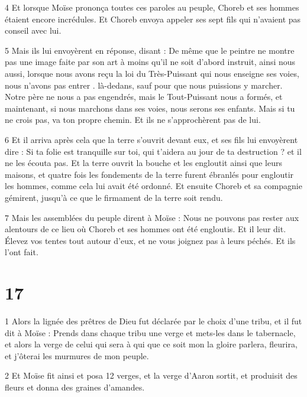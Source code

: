 \par 4 Et lorsque Moïse prononça toutes ces paroles au peuple, Choreb et ses hommes étaient encore incrédules. Et Choreb envoya appeler ses sept fils qui n'avaient pas conseil avec lui.

\par 5 Mais ils lui envoyèrent en réponse, disant : De même que le peintre ne montre pas une image faite par son art à moins qu'il ne soit d'abord instruit, ainsi nous aussi, lorsque nous avons reçu la loi du Très-Puissant qui nous enseigne ses voies, nous n'avons pas entrer . là-dedans, sauf pour que nous puissions y marcher. Notre père ne nous a pas engendrés, mais le Tout-Puissant nous a formés, et maintenant, si nous marchons dans ses voies, nous serons ses enfants. Mais si tu ne crois pas, va ton propre chemin. Et ils ne s'approchèrent pas de lui.

\par 6 Et il arriva après cela que la terre s'ouvrit devant eux, et ses fils lui envoyèrent dire : Si ta folie est tranquille sur toi, qui t'aidera au jour de ta destruction ? et il ne les écouta pas. Et la terre ouvrit la bouche et les engloutit ainsi que leurs maisons, et quatre fois les fondements de la terre furent ébranlés pour engloutir les hommes, comme cela lui avait été ordonné. Et ensuite Choreb et sa compagnie gémirent, jusqu'à ce que le firmament de la terre soit rendu.

\par 7 Mais les assemblées du peuple dirent à Moïse : Nous ne pouvons pas rester aux alentours de ce lieu où Choreb et ses hommes ont été engloutis. Et il leur dit. Élevez vos tentes tout autour d'eux, et ne vous joignez pas à leurs péchés. Et ils l’ont fait.

\chapter{17}

\par 1 Alors la lignée des prêtres de Dieu fut déclarée par le choix d'une tribu, et il fut dit à Moïse : Prends dans chaque tribu une verge et mets-les dans le tabernacle, et alors la verge de celui qui sera à qui que ce soit mon la gloire parlera, fleurira, et j'ôterai les murmures de mon peuple.

\par 2 Et Moïse fit ainsi et posa 12 verges, et la verge d'Aaron sortit, et produisit des fleurs et donna des graines d'amandes.

